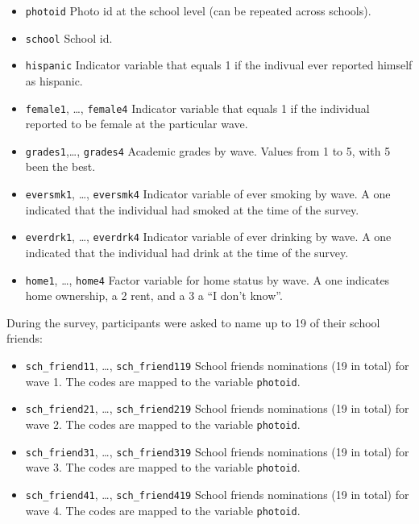 \documentclass[]{book}
\theoremstyle{definition}
\theoremstyle{definition}
\theoremstyle{definition}
\theoremstyle{remark}
\begin{document}
\begin{itemize}
\item
  \texttt{photoid} Photo id at the school level (can be repeated across
  schools).
\item
  \texttt{school} School id.
\item
  \texttt{hispanic} Indicator variable that equals 1 if the indivual
  ever reported himself as hispanic.
\item
  \texttt{female1}, \ldots{}, \texttt{female4} Indicator variable that
  equals 1 if the individual reported to be female at the particular
  wave.
\item
  \texttt{grades1},\ldots{}, \texttt{grades4} Academic grades by wave.
  Values from 1 to 5, with 5 been the best.
\item
  \texttt{eversmk1}, \ldots{}, \texttt{eversmk4} Indicator variable of
  ever smoking by wave. A one indicated that the individual had smoked
  at the time of the survey.
\item
  \texttt{everdrk1}, \ldots{}, \texttt{everdrk4} Indicator variable of
  ever drinking by wave. A one indicated that the individual had drink
  at the time of the survey.
\item
  \texttt{home1}, \ldots{}, \texttt{home4} Factor variable for home
  status by wave. A one indicates home ownership, a 2 rent, and a 3 a
  ``I don't know''.
\end{itemize}

During the survey, participants were asked to name up to 19 of their
school friends:

\begin{itemize}
\item
  \texttt{sch\_friend11}, \ldots{}, \texttt{sch\_friend119} School
  friends nominations (19 in total) for wave 1. The codes are mapped to
  the variable \texttt{photoid}.
\item
  \texttt{sch\_friend21}, \ldots{}, \texttt{sch\_friend219} School
  friends nominations (19 in total) for wave 2. The codes are mapped to
  the variable \texttt{photoid}.
\item
  \texttt{sch\_friend31}, \ldots{}, \texttt{sch\_friend319} School
  friends nominations (19 in total) for wave 3. The codes are mapped to
  the variable \texttt{photoid}.
\item
  \texttt{sch\_friend41}, \ldots{}, \texttt{sch\_friend419} School
  friends nominations (19 in total) for wave 4. The codes are mapped to
  the variable \texttt{photoid}.
\end{itemize}
\end{document}
